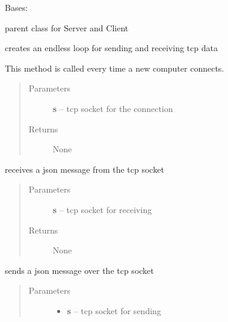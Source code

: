 \documentclass[letterpaper,10pt,english]{sphinxmanual}
\begin{document}
\begin{fulllineitems}
\label{libraries:libraries.ethernet._TcpConnection}
Bases: 

parent class for Server and Client

\begin{fulllineitems}
\label{libraries:libraries.ethernet._TcpConnection._connection}
creates an endless loop for sending and receiving tcp data

This method is called every time a new computer connects.
\begin{quote}\begin{description}
\item[{Parameters}] \leavevmode
\textbf{s} -- tcp socket for the connection

\item[{Returns}] \leavevmode
None

\end{description}\end{quote}

\end{fulllineitems}


\begin{fulllineitems}
\label{libraries:libraries.ethernet._TcpConnection._recv_json}
receives a json message from the tcp socket
\begin{quote}\begin{description}
\item[{Parameters}] \leavevmode
\textbf{s} -- tcp socket for receiving

\item[{Returns}] \leavevmode
None

\end{description}\end{quote}

\end{fulllineitems}


\begin{fulllineitems}
\label{libraries:libraries.ethernet._TcpConnection._send_json}
sends a json message over the tcp socket
\begin{quote}\begin{description}
\item[{Parameters}] \leavevmode\begin{itemize}
\item {} 
\textbf{s} -- tcp socket for sending


\end{itemize}
\end{description}
\end{quote}
\end{fulllineitems}
\end{fulllineitems}
\end{document}
